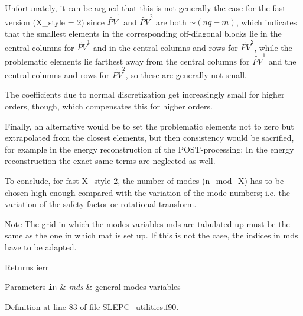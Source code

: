 Unfortunately, it can be argued that this is not generally the case for the fast version ({\ttfamily X\+\_\+style} = 2) since $\widetilde{PV}^1$ and $\widetilde{PV}^2$ are both $\sim (nq-m)$, which indicates that the smallest elements in the corresponding off-\/diagonal blocks lie in the central columns for $\widetilde{PV}^1$ and in the central columns and rows for $\widetilde{PV}^2$, while the problematic elements lie farthest away from the central columns for $\widetilde{PV}^1$ and the central columns and rows for $\widetilde{PV}^2$, so these are generally not small.

The coefficients due to normal discretization get increasingly small for higher orders, though, which compensates this for higher orders.

Finally, an alternative would be to set the problematic elements not to zero but extrapolated from the closest elements, but then consistency would be sacrified, for example in the energy reconstruction of the P\+O\+S\+T-\/processing\+: In the energy reconstruction the exact same terms are neglected as well.

To conclude, for fast {\ttfamily X\+\_\+style} 2, the number of modes ({\ttfamily n\+\_\+mod\+\_\+X}) has to be chosen high enough compared with the variation of the mode numbers; i.\+e. the variation of the safety factor or rotational transform.

\begin{DoxyNote}{Note}
The grid in which the modes variables {\ttfamily mds} are tabulated up must be the same as the one in which {\ttfamily mat} is set up. If this is not the case, the indices in {\ttfamily mds} have to be adapted.
\end{DoxyNote}
\begin{DoxyReturn}{Returns}
ierr
\end{DoxyReturn}

\begin{DoxyParams}[1]{Parameters}
\mbox{\tt in}  & {\em mds} & general modes variables \\
\hline
\end{DoxyParams}


Definition at line 83 of file S\+L\+E\+P\+C\+\_\+utilities.\+f90.

